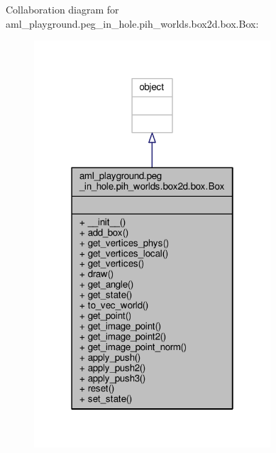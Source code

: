 Collaboration diagram for aml\-\_\-playground.\-peg\-\_\-in\-\_\-hole.\-pih\-\_\-worlds.\-box2d.\-box.\-Box\-:
\nopagebreak
\begin{figure}[H]
\begin{center}
\leavevmode
\includegraphics[width=250pt]{classaml__playground_1_1peg__in__hole_1_1pih__worlds_1_1box2d_1_1box_1_1_box__coll__graph}
\end{center}
\end{figure}
